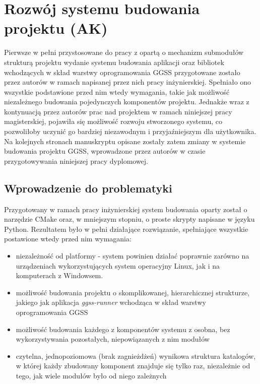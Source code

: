 \clearpage
\section{Rozwój systemu budowania projektu (AK)}
\label{ch:building_project}

Pierwsze w pełni przystosowane do pracy z opartą o mechanizm submodułów strukturą projektu wydanie systemu budowania aplikacji oraz bibliotek wchodzących w skład warstwy oprogramowania GGSS przygotowane zostało przez autorów w ramach napisanej przez nich pracy inżynierskiej. Spełniało ono wszystkie podstawione przed nim wtedy wymagania, takie jak możliwość niezależnego budowania pojedynczych komponentów projektu. Jednakże wraz z kontynuacją przez autorów prac nad projektem w ramach niniejszej pracy magisterskiej, pojawiła się możliwość rozwoju stworzonego systemu, co pozwoliłoby uczynić go bardziej niezawodnym i przyjaźniejszym dla użytkownika. Na kolejnych stronach manuskryptu opisane zostały zatem zmiany w systemie budowania projektu GGSS, wprowadzone przez autorów w czasie przygotowywania niniejszej pracy dyplomowej.

\subsection{Wprowadzenie do problematyki}
Przygotowany w ramach pracy inżynierskiej system budowania oparty został o narzędzie CMake oraz, w mniejszym stopniu, o proste skrypty napisane w języku Python. Rezultatem było w pełni działające rozwiązanie, spełniające wszystkie postawione wtedy przed nim wymagania:
\begin{itemize}
    \item niezależność od platformy - system powinien działać poprawnie zarówno na urządzeniach wykorzystujących system operacyjny Linux, jak i na komputerach z Windowsem.
    \item możliwość budowania projektu o skomplikowanej, hierarchicznej strukturze, jakiego jak aplikacja \emph{ggss-runner} wchodząca w skład warstwy oprogramowania GGSS 
    \item możliwość budowania każdego z komponentów systemu z osobna, bez wykorzystywania pozostałych, niepowiązanych z nim modułów
    \item czytelna, jednopoziomowa (brak zagnieżdżeń) wynikowa struktura katalogów, w której każdy zbudowany komponent znajduje się tylko raz, niezależnie od tego, jak wiele modułów było od niego zależnych
\end{itemize}

